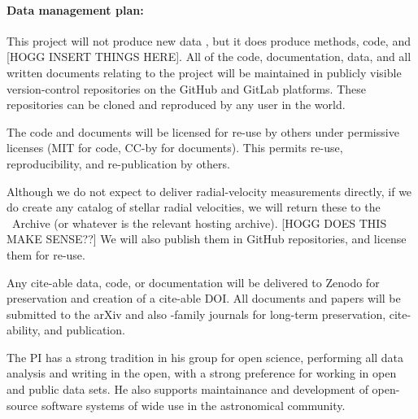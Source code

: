 \documentclass[12pt, fullpage, letterpaper]{article}
\begin{document}
\paragraph{Data management plan:}
This project will not produce new data , but it does produce
methods, code, and [HOGG INSERT THINGS HERE].
All of the code, documentation, data, and all written documents relating to the
project will be maintained in publicly visible version-control repositories on
the GitHub and GitLab platforms. These repositories can be cloned and reproduced by any
user in the world.

The code and documents will be licensed for re-use by others under permissive
licenses (MIT for code, CC-by for documents). This permits re-use, reproducibility,
and re-publication by others.

Although we do not expect to deliver radial-velocity measurements directly, if
we do create any catalog of stellar radial velocities, we will return these to
the \HARPS\ Archive (or whatever is the relevant hosting archive). [HOGG DOES THIS MAKE SENSE??]
We will also publish them in GitHub repositories, and license them for re-use.

Any cite-able data, code, or documentation will be delivered to Zenodo for
preservation and creation of a cite-able DOI.
All documents and papers will be submitted to the arXiv and also \AAS-family
journals for long-term preservation, cite-ability, and publication.

The PI has a strong tradition in his group for open science, performing
all data analysis and writing in the open, with a strong preference for working
in open and public data sets. He also supports maintainance and development of
open-source software systems of wide use in the astronomical community.
\end{document}
